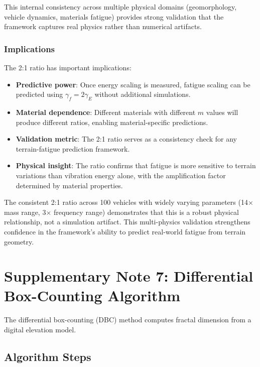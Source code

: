 \documentclass[11pt,letterpaper]{article}
\begin{document}
This internal consistency across multiple physical domains (geomorphology, vehicle dynamics, materials fatigue) provides strong validation that the framework captures real physics rather than numerical artifacts.

\subsubsection{Implications}

The 2:1 ratio has important implications:

\begin{itemize}
\item \textbf{Predictive power}: Once energy scaling is measured, fatigue scaling can be predicted using $\gamma_f = 2\gamma_E$ without additional simulations.

\item \textbf{Material dependence}: Different materials with different $m$ values will produce different ratios, enabling material-specific predictions.

\item \textbf{Validation metric}: The 2:1 ratio serves as a consistency check for any terrain-fatigue prediction framework.

\item \textbf{Physical insight}: The ratio confirms that fatigue is more sensitive to terrain variations than vibration energy alone, with the amplification factor determined by material properties.
\end{itemize}

The consistent 2:1 ratio across 100 vehicles with widely varying parameters (14× mass range, 3× frequency range) demonstrates that this is a robust physical relationship, not a simulation artifact. This multi-physics validation strengthens confidence in the framework's ability to predict real-world fatigue from terrain geometry.


\section{Supplementary Note 7: Differential Box-Counting Algorithm}

The differential box-counting (DBC) method computes fractal dimension from a digital elevation model.

\subsection{Algorithm Steps}
\end{document}
